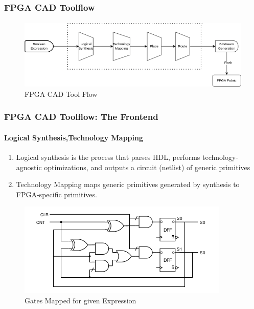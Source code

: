 \documentclass{beamer}
\begin{document}
\begin{frame}[fragile]
  \frametitle{FPGA CAD Toolflow}
  \framesubtitle{}
   \begin{figure}
        \centering
        \includegraphics[width=1\linewidth]{images/cad_flow_fl.png}
        \caption{FPGA CAD Tool Flow}
        \label{exa_cadflow}
    \end{figure}
   
\end{frame}

\begin{frame}[fragile]
    \frametitle{FPGA CAD Toolflow: The Frontend}
    \framesubtitle{Logical Synthesis,Technology Mapping}
    \begin{enumerate}
      \item Logical synthesis is the process that parses HDL, performs
        technology-agnostic optimizations, and outputs a circuit (netlist)
        of generic primitives
      \item Technology Mapping maps generic primitives generated by synthesis to
        FPGA-specific primitives. 
    \end{enumerate}
    \begin{figure}
        \includegraphics[width=0.5\linewidth]{images/netlist_gate.png}
        \caption{Gates Mapped for given Expression}
        \label{exa_mapgate}
    \end{figure}

\end{frame}
\end{document}

